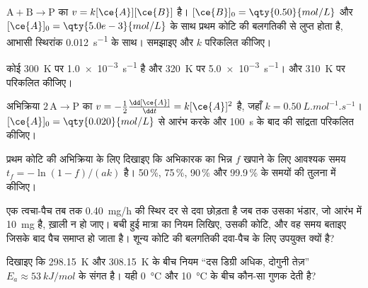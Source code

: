 \begin{exercise}[$\star\star$]\label{exo:b1:rate-laws:7}
$\mathrm{A} + \mathrm{B} \longrightarrow \mathrm{P}$ का  $v = k[\ce{A}][\ce{B}]$ है।
$[\ce{B}]_0 = \qty{0.50}{mol/L}$ और $[\ce{A}]_0 = \qty{5.0e-3}{mol/L}$ के साथ
 प्रथम कोटि की बलगतिकी से लुप्त होता है, आभासी स्थिरांक
\qty{0.012}{s^{-1}} के साथ। समझाइए और $k$ परिकलित कीजिए।
\end{exercise}

\begin{exercise}[$\star\star$]\label{exo:b1:rate-laws:8}
कोई  \qty{300}{K} पर \qty{1.0e-3}{s^{-1}} है और
\qty{320}{K} पर \qty{5.0e-3}{s^{-1}}।  और
\qty{310}{K} पर  परिकलित कीजिए।
\end{exercise}

\begin{exercise}[$\star\star$]\label{exo:b1:rate-laws:9}
अभिक्रिया $2\,\mathrm{A} \longrightarrow \mathrm{P}$ का  $v = -\frac12\frac{\dd[\ce{A}]}
{\dd t} = k[\ce{A}]^2$ है, जहाँ $k = \qty{0.50}{L.mol^{-1}.s^{-1}}$।
$[\ce{A}]_0 = \qty{0.020}{mol/L}$ से आरंभ करके  और
\qty{100}{s} के बाद की सांद्रता परिकलित कीजिए।
\end{exercise}

\begin{exercise}[$\star\star\star$]\label{exo:b1:rate-laws:10}
प्रथम कोटि की अभिक्रिया के लिए दिखाइए कि अभिकारक का भिन्न $f$ खपाने के लिए
आवश्यक समय $t_f = -\ln(1 - f)/(ak)$ है। 50\,\%, 75\,\%, 90\,\% और 99.9\,\% के
समयों की तुलना  में कीजिए।
\end{exercise}

\begin{exercise}[$\star\star\star$]\label{exo:b1:rate-laws:11}
एक त्वचा-पैच तब तक \qty{0.40}{mg/h} की स्थिर दर से दवा छोड़ता है
जब तक उसका भंडार, जो आरंभ में \qty{10}{mg} है, ख़ाली न हो जाए। बची हुई मात्रा का नियम लिखिए,
उसकी कोटि,  और वह समय बताइए जिसके बाद पैच
समाप्त हो जाता है। शून्य कोटि की बलगतिकी दवा-पैच के लिए उपयुक्त क्यों है?
\end{exercise}

\begin{exercise}[$\star\star\star$]\label{exo:b1:rate-laws:12}
दिखाइए कि \qty{298.15}{K} और \qty{308.15}{K} के बीच नियम ``दस डिग्री अधिक, दोगुनी
तेज़'' $E_a \approx
\qty{53}{kJ/mol}$ के संगत है। यही 
\qty{0}{\celsius} और \qty{10}{\celsius} के बीच कौन-सा गुणक देती है?
\end{exercise}

